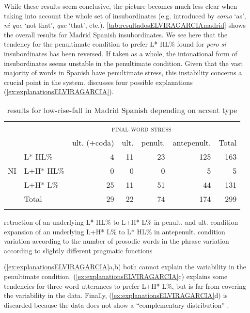 While these results seem conclusive, the picture becomes much less clear when taking into account the whole set of insubordinates (e.g. introduced by \textit{como} `as',  \textit{ni que} `not that', \textit{que} `that', etc.). \autoref{tab:resultadosELVIRAGARCIAmadrid} shows the overall results for Madrid Spanish insubordinates. We see here that the tendency for the penultimate condition to prefer L* HL\% found for \textit{pero si} insubordinates has been reversed. If taken as a whole, the intonational form of insubordinates seems unstable in the penultimate condition. Given that the vast majority of words in Spanish have penultimate stress, this instability concerns a crucial point in the system. \citet[253–263]{ElviraGarcia.2016} discusses four possible explanations (\ref{ex:explanationsELVIRAGARCIA}).

\begin{table}
	\begin{tabular}{llrrrrr}
		\lsptoprule
		 & & \multicolumn{4}{c}{\textsc{final word stress}} & \\\cmidrule(lr){3-6}
		 & & ult. ($+$coda) & ult. & penult. & ante\-penult. & Total \\\midrule
		\multirow{3}{*}{\textsc{NI}} & L* HL\% & 4 & 11 & 23 & 125 & 163 \\
											   & L+H* HL\% & 0 & 0 & 0 & 5 & 5 \\
											   & L+H* L\% & 25 & 11 & 51 & 44 & 131 \\
											   & Total & 29 & 22 & 74 & 174 & 299 \\	 
		\lspbottomrule
	\end{tabular}
	\caption{\citet[254]{ElviraGarcia.2016} results for low-rise-fall in Madrid Spanish depending on accent type\label{tab:resultadosELVIRAGARCIAmadrid}}
\end{table}

\begin{exe}
	\ex \label{ex:explanationsELVIRAGARCIA}
	\begin{xlist}
		\ex retraction of an underlying L* HL\% to L+H* L\% in penult. and ult. condition
		\ex expansion of an underlying L+H* L\% to L* HL\% in antepenult. condition
		\ex variation according to the number of prosodic words in the phrase 
		\ex variation according to slightly different pragmatic functions
	\end{xlist}
\end{exe}

(\ref{ex:explanationsELVIRAGARCIA}a,b) both cannot explain the variability in the penultimate condition. (\ref{ex:explanationsELVIRAGARCIA}c) explains some tendencies for three-word utterances to prefer L+H* L\%, but is far from covering the variability in the data. Finally, (\ref{ex:explanationsELVIRAGARCIA}d) is discarded because the data does not show a ``complementary distribution'' \citep[253]{ElviraGarcia.2016}. 

